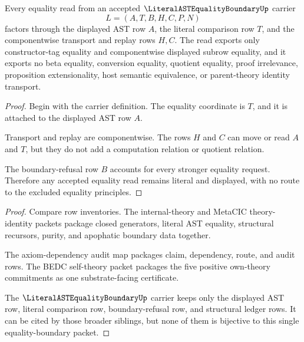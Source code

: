 \begin{theorem}
\label{thm:literal-ast-equality-boundary-exactness}
Every equality read from an accepted $\LiteralASTEqualityBoundaryUp$ carrier
$$
L=(A,T,B,H,C,P,N)
$$
factors through the displayed AST row $A$, the literal comparison row $T$, and the componentwise transport and replay rows $H,C$. The read exports only constructor-tag equality and componentwise displayed subrow equality, and it exports no beta equality, conversion equality, quotient equality, proof irrelevance, proposition extensionality, host semantic equivalence, or parent-theory identity transport.
\end{theorem}
\begin{proof}
Begin with the carrier definition. The equality coordinate is $T$, and it is attached to the displayed AST row $A$.

Transport and replay are componentwise. The rows $H$ and $C$ can move or read $A$ and $T$, but they do not add a computation relation or quotient relation.

The boundary-refusal row $B$ accounts for every stronger equality request. Therefore any accepted equality read remains literal and displayed, with no route to the excluded equality principles.
\end{proof}

\begin{theorem}
\label{thm:literal-ast-equality-boundary-sibling-independence}
\end{theorem}
\begin{proof}
Compare row inventories. The internal-theory and MetaCIC theory-identity packets package closed generators, literal AST equality, structural recursors, purity, and apophatic boundary data together.

The axiom-dependency audit map packages claim, dependency, route, and audit rows. The BEDC self-theory packet packages the five positive own-theory commitments as one substrate-facing certificate.

The $\LiteralASTEqualityBoundaryUp$ carrier keeps only the displayed AST row, literal comparison row, boundary-refusal row, and structural ledger rows. It can be cited by those broader siblings, but none of them is bijective to this single equality-boundary packet.
\end{proof}

